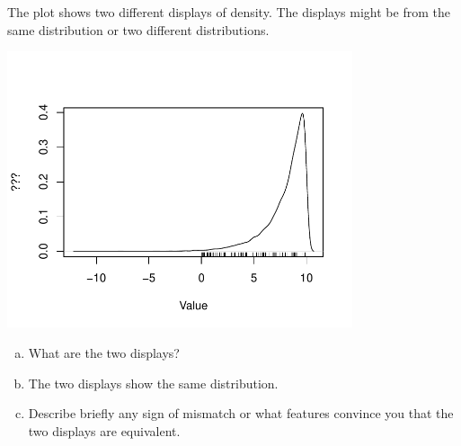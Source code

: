 



The plot shows two different displays of density.  The displays might
be from the same distribution or two different distributions.


\centerline{\includegraphics[width=4in]{Figures/B103-5-exp.pdf}}

\begin{enumerate}[(a)]
\item What are the two displays?

\begin{MultipleChoice}
\end{MultipleChoice}

\item 
The two displays show the same distribution.  


\item Describe briefly any sign of mismatch or what features convince you
that the two displays are equivalent. \\
\TextEntry
\end{enumerate}

